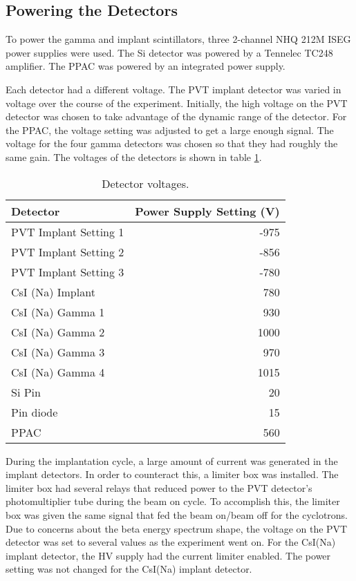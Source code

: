 \documentclass[../MaxHughesThesis.tex]{subfiles}
\begin{document}
\subsection{Powering the Detectors}

To power the gamma and implant scintillators, three 2-channel NHQ 212M ISEG power supplies were used.
The Si detector was powered by a Tennelec TC248 amplifier.
The PPAC was powered by an integrated power supply.

Each detector had a different voltage. 
The PVT implant detector was varied in voltage over the course of the experiment.
Initially, the high voltage on the PVT detector was chosen to take advantage of the dynamic range of the detector.
For the PPAC, the voltage setting was adjusted to get a large enough signal.
The voltage for the four gamma detectors was chosen so that they had roughly the same gain.
The voltages of the detectors is shown in table \ref{tab:detvolt}.
\begin{table}[!hbt]
	\caption{Detector voltages.}
	\centering
		\begin{tabular}{lr}
		Detector & Power Supply Setting (V) \\ \hline
		PVT Implant Setting 1 & -975 \\
		PVT Implant Setting 2 & -856 \\
		PVT Implant Setting 3 & -780 \\
		CsI (Na) Implant & 780 \\ 
		CsI (Na) Gamma 1 & 930 \\
		CsI (Na) Gamma 2 & 1000 \\
		CsI (Na) Gamma 3 & 970 \\
		CsI (Na) Gamma 4 & 1015 \\
		Si Pin & 20 \\
		Pin diode & 15 \\
		PPAC & 560  
		\end{tabular}
	\label{tab:detvolt}
\end{table}

During the implantation cycle, a large amount of current was generated in the implant detectors.
In order to counteract this, a limiter box was installed.
The limiter box had several relays that reduced power to the PVT detector's photomultiplier tube during the beam on cycle. 
To accomplish this, the limiter box was given the same signal that fed the beam on/beam off for the cyclotrons.
Due to concerns about the beta energy spectrum shape, the voltage on the PVT detector was set to several values as the experiment went on. 
For the CsI(Na) implant detector, the HV supply had the current limiter enabled.
The power setting was not changed for the CsI(Na) implant detector. 
\end{document}
